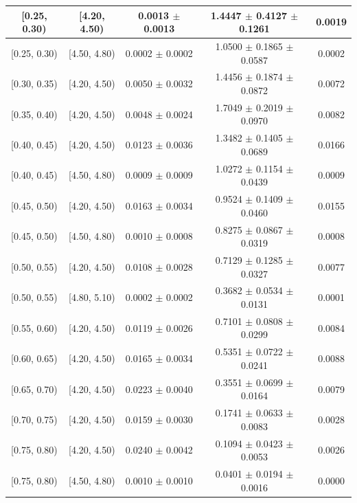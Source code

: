 \begin{longtable}{|c|c|c|c|c|}
\hline
\endlastfoot
[0.25, 0.30) & [4.20, 4.50) & 0.0013 $\pm$ 0.0013 & 1.4447 $\pm$ 0.4127 $\pm$ 0.1261 & 0.0019 \\ 
\hline
[0.25, 0.30) & [4.50, 4.80) & 0.0002 $\pm$ 0.0002 & 1.0500 $\pm$ 0.1865 $\pm$ 0.0587 & 0.0002 \\ 
\hline
[0.30, 0.35) & [4.20, 4.50) & 0.0050 $\pm$ 0.0032 & 1.4456 $\pm$ 0.1874 $\pm$ 0.0872 & 0.0072 \\ 
\hline
[0.35, 0.40) & [4.20, 4.50) & 0.0048 $\pm$ 0.0024 & 1.7049 $\pm$ 0.2019 $\pm$ 0.0970 & 0.0082 \\ 
\hline
[0.40, 0.45) & [4.20, 4.50) & 0.0123 $\pm$ 0.0036 & 1.3482 $\pm$ 0.1405 $\pm$ 0.0689 & 0.0166 \\ 
\hline
[0.40, 0.45) & [4.50, 4.80) & 0.0009 $\pm$ 0.0009 & 1.0272 $\pm$ 0.1154 $\pm$ 0.0439 & 0.0009 \\ 
\hline
[0.45, 0.50) & [4.20, 4.50) & 0.0163 $\pm$ 0.0034 & 0.9524 $\pm$ 0.1409 $\pm$ 0.0460 & 0.0155 \\ 
\hline
[0.45, 0.50) & [4.50, 4.80) & 0.0010 $\pm$ 0.0008 & 0.8275 $\pm$ 0.0867 $\pm$ 0.0319 & 0.0008 \\ 
\hline
[0.50, 0.55) & [4.20, 4.50) & 0.0108 $\pm$ 0.0028 & 0.7129 $\pm$ 0.1285 $\pm$ 0.0327 & 0.0077 \\ 
\hline
[0.50, 0.55) & [4.80, 5.10) & 0.0002 $\pm$ 0.0002 & 0.3682 $\pm$ 0.0534 $\pm$ 0.0131 & 0.0001 \\ 
\hline
[0.55, 0.60) & [4.20, 4.50) & 0.0119 $\pm$ 0.0026 & 0.7101 $\pm$ 0.0808 $\pm$ 0.0299 & 0.0084 \\ 
\hline
[0.60, 0.65) & [4.20, 4.50) & 0.0165 $\pm$ 0.0034 & 0.5351 $\pm$ 0.0722 $\pm$ 0.0241 & 0.0088 \\ 
\hline
[0.65, 0.70) & [4.20, 4.50) & 0.0223 $\pm$ 0.0040 & 0.3551 $\pm$ 0.0699 $\pm$ 0.0164 & 0.0079 \\ 
\hline
[0.70, 0.75) & [4.20, 4.50) & 0.0159 $\pm$ 0.0030 & 0.1741 $\pm$ 0.0633 $\pm$ 0.0083 & 0.0028 \\ 
\hline
[0.75, 0.80) & [4.20, 4.50) & 0.0240 $\pm$ 0.0042 & 0.1094 $\pm$ 0.0423 $\pm$ 0.0053 & 0.0026 \\ 
\hline
[0.75, 0.80) & [4.50, 4.80) & 0.0010 $\pm$ 0.0010 & 0.0401 $\pm$ 0.0194 $\pm$ 0.0016 & 0.0000 \\ 
\hline
\end{longtable}
